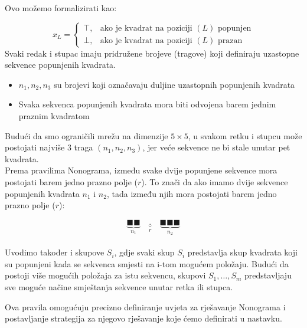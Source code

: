 \documentclass[a4paper,12pt]{article}
\begin{document}
Ovo možemo formalizirati kao:

\[
    x_{L} =
    \begin{cases} 
        \top, & \text{ako je kvadrat na poziciji } (L) \text{ popunjen} \\
        \bot, & \text{ako je kvadrat na poziciji } (L) \text{ prazan}
    \end{cases}
\]
\clearpage
Svaki redak i stupac imaju pridružene brojeve (tragove) koji definiraju uzastopne sekvence popunjenih kvadrata.
\begin{itemize}
    \item $n_1, n_2, n_3$ su brojevi koji označavaju duljine uzastopnih popunjenih kvadrata
    \item Svaka sekvenca popunjenih kvadrata mora biti odvojena barem jednim praznim kvadratom
\end{itemize}

Budući da smo ograničili mrežu na dimenzije $5\times5$, u svakom retku i stupcu može postojati najviše 3 traga $(n_1, n_2, n_3)$, jer veće sekvence ne bi stale unutar pet kvadrata.
\\

Prema pravilima Nonograma, između svake dvije popunjene sekvence mora postojati barem jedno prazno polje ($r$). 
To znači da ako imamo dvije sekvence popunjenih kvadrata $n_1$ i $n_2$, tada između njih mora postojati barem jedno prazno polje ($r$):

\[
    \underbrace{\blacksquare \blacksquare}_{n_1} \quad \underbrace{.}_{r} \quad \underbrace{\blacksquare \blacksquare \blacksquare}_{n_2}
\]
\\

Uvodimo također i skupove $S_i$, gdje svaki skup $S_i$ predstavlja skup kvadrata koji su popunjeni kada se sekvenca smjesti na i-tom mogućem položaju. 
Budući da postoji više mogućih položaja za istu sekvencu, skupovi $S_1, \dots ,S_m$ predstavljaju sve moguće načine smještanja sekvence unutar retka ili stupca.

Ova pravila omogućuju precizno definiranje uvjeta za rješavanje Nonograma i postavljanje strategija za njegovo rješavanje koje ćemo definirati u nastavku.
\end{document}

